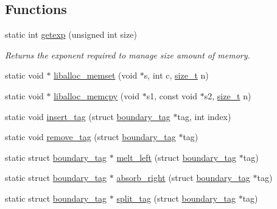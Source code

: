 \subsection*{Functions}
\begin{DoxyCompactItemize}
\item 
static int \hyperlink{a00035_ab5fc0b977bf14bdb99c8b87cae451d42_ab5fc0b977bf14bdb99c8b87cae451d42}{getexp} (unsigned int size)
\begin{DoxyCompactList}\small\item\em Returns the exponent required to manage \textquotesingle{}size\textquotesingle{} amount of memory. \end{DoxyCompactList}\item 
static void $\ast$ \hyperlink{a00035_ad824e94da51543e1febb05f96f0083ba_ad824e94da51543e1febb05f96f0083ba}{liballoc\+\_\+memset} (void $\ast$s, int c, \hyperlink{a00038_a7c94ea6f8948649f8d181ae55911eeaf_a7c94ea6f8948649f8d181ae55911eeaf}{size\+\_\+t} n)
\item 
static void $\ast$ \hyperlink{a00035_a58b3101a659b6a2f7e2ca290bef6bfb4_a58b3101a659b6a2f7e2ca290bef6bfb4}{liballoc\+\_\+memcpy} (void $\ast$s1, const void $\ast$s2, \hyperlink{a00038_a7c94ea6f8948649f8d181ae55911eeaf_a7c94ea6f8948649f8d181ae55911eeaf}{size\+\_\+t} n)
\item 
static void \hyperlink{a00035_a569f88ed08d8435e256dd225afcd26df_a569f88ed08d8435e256dd225afcd26df}{insert\+\_\+tag} (struct \hyperlink{a00126}{boundary\+\_\+tag} $\ast$tag, int index)
\item 
static void \hyperlink{a00035_aeea23ead928f2a5d40fdf7687b3c99c9_aeea23ead928f2a5d40fdf7687b3c99c9}{remove\+\_\+tag} (struct \hyperlink{a00126}{boundary\+\_\+tag} $\ast$tag)
\item 
static struct \hyperlink{a00126}{boundary\+\_\+tag} $\ast$ \hyperlink{a00035_a7ea762780416b837601691f20e085cc2_a7ea762780416b837601691f20e085cc2}{melt\+\_\+left} (struct \hyperlink{a00126}{boundary\+\_\+tag} $\ast$tag)
\item 
static struct \hyperlink{a00126}{boundary\+\_\+tag} $\ast$ \hyperlink{a00035_a9d9646746f3401f7c03ff66cba7315c8_a9d9646746f3401f7c03ff66cba7315c8}{absorb\+\_\+right} (struct \hyperlink{a00126}{boundary\+\_\+tag} $\ast$tag)
\item 
static struct \hyperlink{a00126}{boundary\+\_\+tag} $\ast$ \hyperlink{a00035_a8fd489a9d383dd6830e38fa63a0aec60_a8fd489a9d383dd6830e38fa63a0aec60}{split\+\_\+tag} (struct \hyperlink{a00126}{boundary\+\_\+tag} $\ast$tag)
\item 

\end{DoxyCompactItemize}
